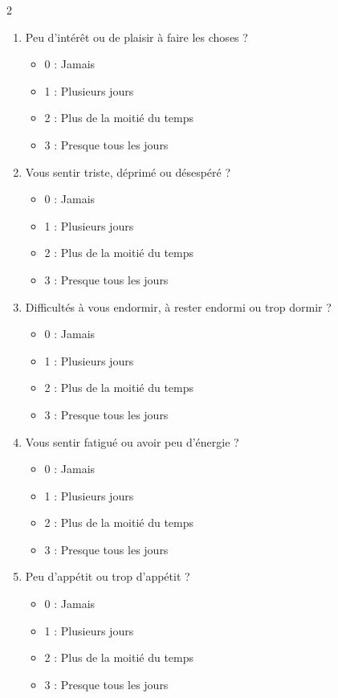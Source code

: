\begin{multicols}{2}

\begin{enumerate}
	\item[1.] Peu d’intérêt ou de plaisir à faire les choses ?
  	\begin{itemize}[label={$\bullet$}]
		\item 0 : Jamais 
		\item 1 : Plusieurs jours 
		\item 2 : Plus de la moitié du temps
		\item 3 : Presque tous les jours
	\end{itemize}

	\item[2.] Vous sentir triste, déprimé ou désespéré ?
  	\begin{itemize}[label={$\bullet$}]
		\item 0 : Jamais 
		\item 1 : Plusieurs jours 
		\item 2 : Plus de la moitié du temps
		\item 3 : Presque tous les jours
	\end{itemize}

	\item[3.] Difficultés à vous endormir, à rester endormi ou trop dormir ?
  	\begin{itemize}[label={$\bullet$}]
		\item 0 : Jamais 
		\item 1 : Plusieurs jours 
		\item 2 : Plus de la moitié du temps
		\item 3 : Presque tous les jours
	\end{itemize}

	\item[4.] Vous sentir fatigué ou avoir peu d’énergie ?
  	\begin{itemize}[label={$\bullet$}]
		\item 0 : Jamais 
		\item 1 : Plusieurs jours 
		\item 2 : Plus de la moitié du temps
		\item 3 : Presque tous les jours
	\end{itemize}

	\item[5.] Peu d’appétit ou trop d’appétit ?
  	\begin{itemize}[label={$\bullet$}]
		\item 0 : Jamais 
		\item 1 : Plusieurs jours 
		\item 2 : Plus de la moitié du temps
		\item 3 : Presque tous les jours
	\end{itemize} \columnbreak


\end{enumerate}
\end{multicols}
